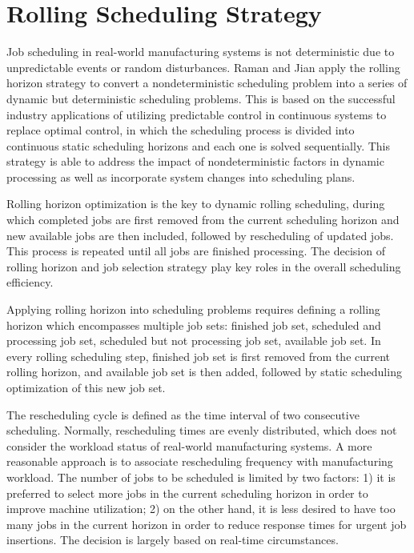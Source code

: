 \section{Rolling Scheduling Strategy}
Job scheduling in real-world manufacturing systems is not deterministic due to unpredictable events or random disturbances.
Raman \citep{raman19933} and Jian \citep{jian19972} apply the rolling horizon strategy to convert a nondeterministic scheduling problem into a series of dynamic but deterministic scheduling problems.
This is based on the successful industry applications of utilizing predictable control in continuous systems to replace optimal control, in which the scheduling process is divided into continuous static scheduling horizons and each one is solved sequentially.
This strategy is able to address the impact of nondeterministic factors in dynamic processing as well as incorporate system changes into scheduling plans.

Rolling horizon optimization is the key to dynamic rolling scheduling, during which completed jobs are first removed from the current scheduling horizon and new available jobs are then included, followed by rescheduling of updated jobs. 
This process is repeated until all jobs are finished processing.
The decision of rolling horizon and job selection strategy play key roles in the overall scheduling efficiency.

Applying rolling horizon into scheduling problems requires defining a rolling horizon which encompasses multiple job sets: finished job set, scheduled and processing job set, scheduled but not processing job set, available job set.
In every rolling scheduling step, finished job set is first removed from the current rolling horizon, and available job set is then added, followed by static scheduling optimization of this new job set.

The rescheduling cycle is defined as the time interval of two consecutive scheduling.
Normally, rescheduling times are evenly distributed, which does not consider the workload status of real-world manufacturing systems.
A more reasonable approach is to associate rescheduling frequency with manufacturing workload.
The number of jobs to be scheduled is limited by two factors: 1) it is preferred to select more jobs in the current scheduling horizon in order to improve machine utilization; 2) on the other hand, it is less desired to have too many jobs in the current horizon in order to reduce response times for urgent job insertions.
The decision is largely based on real-time circumstances.

